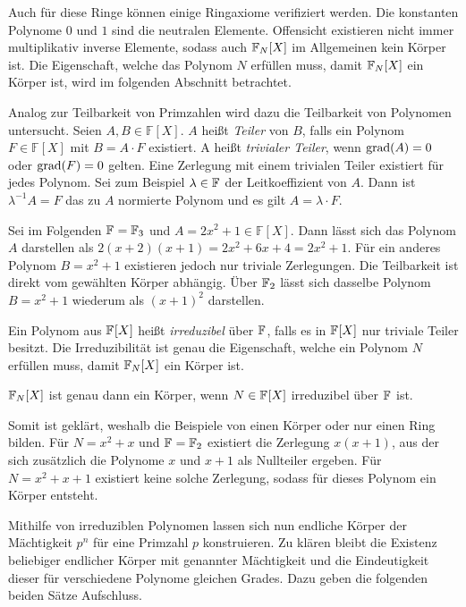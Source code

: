 Auch für diese Ringe können einige Ringaxiome verifiziert werden. Die konstanten Polynome $0$ und $1$ sind die neutralen Elemente. Offensicht existieren nicht immer multiplikativ inverse Elemente, sodass auch $\field{N} {[X]}$ im Allgemeinen kein Körper ist. Die Eigenschaft, welche das Polynom $N$ erfüllen muss, damit $\field{N} {[X]}$ ein Körper ist, wird im folgenden Abschnitt betrachtet.

Analog zur Teilbarkeit von Primzahlen wird dazu die Teilbarkeit von Polynomen untersucht. Seien $A,B \in \mathbb{F} {[X]}$. $A$ heißt \emph{Teiler} von $B$, falls ein Polynom $F \in \mathbb{F} {[X]}$ mit $B = A \cdot F$ existiert. A heißt \emph{trivialer Teiler}, wenn $\mathrm{grad}(A) = 0$ oder $\mathrm{grad}(F) = 0$ gelten. Eine Zerlegung mit einem trivialen Teiler existiert für jedes Polynom. Sei zum Beispiel $\lambda \in \field{}$  der Leitkoeffizient von $A$. Dann ist $\lambda^{-1}A = F$ das zu $A$ normierte Polynom und es gilt $A = \lambda\cdot F$.

Sei im Folgenden $\field{} = \field{3}$ und $A=2x^2 + 1 \in \mathbb{F} {[X]}$. Dann lässt sich das Polynom $A$ darstellen als $2(x+2)(x+1) = 2x^2 + 6x + 4 = 2x^2 + 1$. Für ein anderes Polynom $B=x^2 + 1$ existieren jedoch nur triviale Zerlegungen. Die Teilbarkeit ist direkt vom gewählten Körper abhängig. Über $\field{2}$ lässt sich dasselbe Polynom $B=x^2 + 1$ wiederum als $(x+1)^2$ darstellen.

Ein Polynom aus $\field{} {[X]}$ heißt \emph{irreduzibel} über $\field{}$, falls es in $\field{} {[X]}$ nur triviale Teiler besitzt. Die Irreduzibilität ist genau die Eigenschaft, welche ein Polynom $N$ erfüllen muss, damit $\field{N} {[X]}$ ein Körper ist. 

\begin{satz}
    $\field{N} {[X]}$ ist genau dann ein Körper, wenn $N \in \field{}{[X]}$ irreduzibel über $\field{}$ ist.
\end{satz}

Somit ist geklärt, weshalb die Beispiele von  einen Körper oder nur einen Ring bilden. Für $N=x^2 + x$ und $\field{} = \field{2}$ existiert die Zerlegung $x(x+1)$, aus der sich zusätzlich die Polynome $x$ und $x+1$ als Nullteiler ergeben. Für $N=x^2 + x + 1$ existiert keine solche Zerlegung, sodass für dieses Polynom ein Körper entsteht.

Mithilfe von irreduziblen Polynomen lassen sich nun endliche Körper der Mächtigkeit $p^n$ für eine Primzahl $p$ konstruieren. Zu klären bleibt die Existenz beliebiger endlicher Körper mit genannter Mächtigkeit und die Eindeutigkeit dieser für verschiedene Polynome gleichen Grades. Dazu geben die folgenden beiden Sätze Aufschluss.

